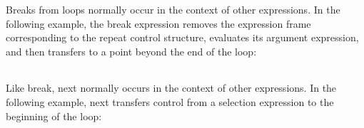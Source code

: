 Breaks from loops normally occur in the context of other
expressions. In the following example, the break expression removes
the expression frame corresponding to the repeat control structure,
evaluates its argument expression, and then transfers to a point
beyond the end of the loop:

\begin{center}
\tablelasttail{\hline}
\begin{supertabular}{|m{1.9073598in}|m{2.75596in}|}

\end{supertabular}
\end{center}

Like break, next normally occurs in the context of other
expressions. In the following example, next transfers control from a
selection expression to the beginning of the loop:

